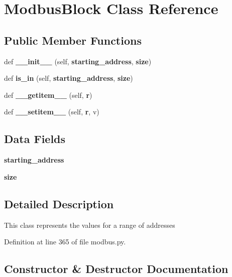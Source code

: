 \section{Modbus\+Block Class Reference}
\label{classprotolibs_1_1modbus__tk_1_1modbus_1_1_modbus_block}
\subsection*{Public Member Functions}
\begin{DoxyCompactItemize}
\item 
def {\bf \+\_\+\+\_\+init\+\_\+\+\_\+} (self, {\bf starting\+\_\+address}, {\bf size})
\item 
def {\bf is\+\_\+in} (self, {\bf starting\+\_\+address}, {\bf size})
\item 
def {\bf \+\_\+\+\_\+getitem\+\_\+\+\_\+} (self, {\bf r})
\item 
def {\bf \+\_\+\+\_\+setitem\+\_\+\+\_\+} (self, {\bf r}, v)
\end{DoxyCompactItemize}
\subsection*{Data Fields}
\begin{DoxyCompactItemize}
\item 
{\bf starting\+\_\+address}
\item 
{\bf size}
\end{DoxyCompactItemize}


\subsection{Detailed Description}
\begin{DoxyVerb}This class represents the values for a range of addresses\end{DoxyVerb}
 

Definition at line 365 of file modbus.\+py.



\subsection{Constructor \& Destructor Documentation}
